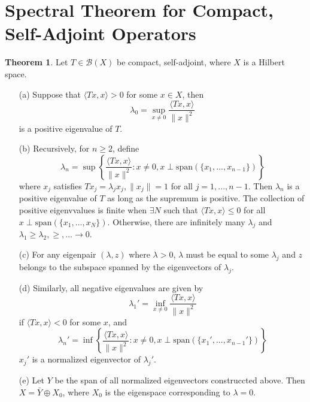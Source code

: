 \documentclass{article}
\theoremstyle{definition}
\newtheorem{thm}{Theorem}
\newcommand{\B}{\mathcal B}
\begin{document}
\section{Spectral Theorem for Compact, Self-Adjoint Operators}

\begin{thm}
	Let $T \in \B(X)$ be compact, self-adjoint, where $X$ is a Hilbert space.
	\begin{enumerate}
		\item[(a)] Suppose that $\langle Tx, x \rangle > 0$ for some $x \in X$, then
			\[
				\lambda_0 = \sup_{x \neq 0} \frac{ \langle T x, x \rangle}{\|x\|^2}
			\]
			is a positive eigenvalue of $T$.

		\item[(b)] Recursively, for $n \geq 2$, define 
			\[
				\lambda_n = \sup \left\{\frac{\langle T x, x \rangle}{\|x\|^2}: x \neq 0, x \perp \text{span}(\{x_1, ..., x_{n - 1}\}) \right\}
			\]
			where $x_j$ satisfies $T x_j = \lambda_j x_j, \|x_j\| = 1$ for all $j = 1, ..., n - 1$.
			Then $\lambda_n$ is a positive eigenvalue of $T$ as long as the supremum is positive.
			The collection of positive eigenvvalues is finite when $\exists N$ such that $\langle T x, x \rangle \leq 0$ for all $x \perp \text{span}(\{x_1, ..., x_N\})$.
			Otherwise, there are infinitely many $\lambda_j$ and $\lambda_1 \geq \lambda_2, \geq, ... \to 0$.

		\item[(c)] For any eigenpair $(\lambda, z)$ where $\lambda > 0$, $\lambda$ must be equal to some $\lambda_j$ and $z$ belongs to the subspace spanned by the eigenvectors of $\lambda_j$.

		\item[(d)] Similarly, all negative eigenvalues are given by 
			\[
				\lambda_1' = \inf_{x \neq 0} \frac{\langle T x, x \rangle}{\|x\|^2}
			\]
			if $\langle T x, x \rangle < 0$ for some $x$, and 
			\[
				\lambda_n' = \inf \left\{ \frac{\langle T x, x \rangle}{\|x\|^2}: x \neq 0, x \perp \text{span}(\{x_1', ..., x_{n - 1}'\})\right\}
			\]
			$x_j'$ is a normalized eigenvector of $\lambda_j'$.

		\item[(e)] Let $Y$ be the span of all normalized eigenvectors construccted above.
			Then $X = \bar{Y} \oplus X_0$, where $X_0$ is the eigenspace corresponding to $\lambda = 0$.
	\end{enumerate}
\end{thm}
\end{document}
